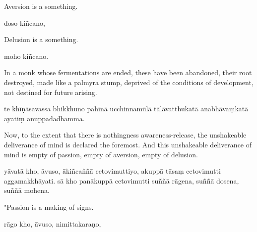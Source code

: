 \begin{samepage}
\begin{leftcolumn*}
Aversion is a something.
\end{leftcolumn*}

\begin{rightcolumn}
doso kiñcano,
\end{rightcolumn}
\end{samepage}

\begin{samepage}
\begin{leftcolumn*}
Delusion is a something.
\end{leftcolumn*}

\begin{rightcolumn}
moho kiñcano.
\end{rightcolumn}
\end{samepage}

\begin{samepage}
\begin{leftcolumn*}
In a monk whose fermentations are ended, these have been abandoned, their root destroyed, made like a palmyra stump, deprived of the conditions of development, not destined for future arising.
\end{leftcolumn*}

\begin{rightcolumn}
te khīṇāsavassa bhikkhuno pahīnā ucchinnamūlā tālāvatthukatā anabhāvaṃkatā āyatiṃ anuppādadhammā.
\end{rightcolumn}
\end{samepage}

\begin{samepage}
\begin{leftcolumn*}
Now, to the extent that there is nothingness awareness-release, the unshakeable deliverance of mind is declared the foremost.
And this unshakeable deliverance of mind is empty of passion, empty of aversion, empty of delusion.
\end{leftcolumn*}

\begin{rightcolumn}
yāvatā kho, āvuso, ākiñcaññā cetovimuttiyo, akuppā tāsaṃ cetovimutti aggamakkhāyati.
sā kho panākuppā cetovimutti suññā rāgena, suññā dosena, suññā mohena.
\end{rightcolumn}
\end{samepage}

\begin{samepage}
\begin{leftcolumn*}
"Passion is a making of signs.
\end{leftcolumn*}

\begin{rightcolumn}
rāgo kho, āvuso, nimittakaraṇo,
\end{rightcolumn}
\end{samepage}

